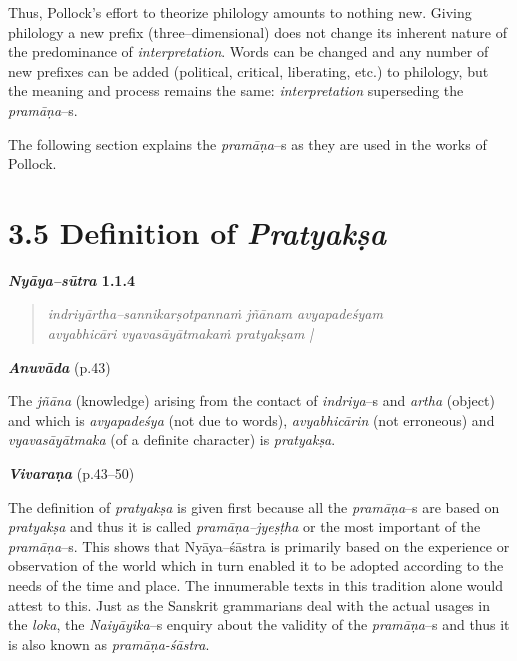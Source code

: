 \vspace{-.3cm}

Thus, Pollock’s effort to theorize philology amounts to nothing new. Giving philology a new prefix (three–dimensional) does not change its inherent nature of the predominance of \textit{interpretation}. Words can be changed and any number of new prefixes can be added (political, critical, liberating, etc.) to philology, but the meaning and process remains the same: \textit{interpretation} superseding the \textit{pramāṇa}–s.

The following section explains the \textit{pramāṇa}–s as they are used in the works of Pollock.

\newpage

\section*{3.5 Definition of {\it {\bfseries Pratyakṣa}}}

\textbf{\textit{Nyāya–sūtra} 1.1.4}

\vspace{-.3cm}

\begin{verse}
\textit{indriyārtha–sannikarṣotpannaṁ jñānam avyapadeśyam\\ avyabhicāri vyavasāyātmakaṁ pratyakṣam |}
\end{verse}

\vspace{-.3cm}

\textit{\textbf{Anuvāda }}(p.43)

The \textit{jñāna} (knowledge) arising from the contact of \textit{indriya}–s and \textit{artha} (object) and which is \textit{avyapadeśya }(not due to words), \textit{avyabhicārin }(not erroneous) and \textit{vyavasāyātmaka }(of a definite character) is \textit{pratyakṣa}.

\textbf{\textit{Vivaraṇa}} (p.43–50)

The definition of \textit{pratyakṣa }is given first because all the \textit{pramāṇa}–s are based on \textit{pratyakṣa }and thus it is called \textit{pramāṇa–jyeṣṭha} or the most important of the \textit{pramāṇa}–s. This shows that Nyāya–śāstra is primarily based on the experience or observation of the world which in turn enabled it to be adopted according to the needs of the time and place. The innumerable texts in this tradition alone would attest to this. Just as the Sanskrit grammarians deal with the actual usages in the \textit{loka}, the \textit{Naiyāyika}–s enquiry about the validity of the \textit{pramāṇa}–s and thus it is also known as \textit{pramāṇa-śāstra}.

